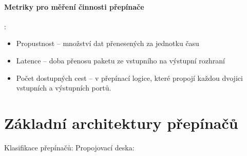 \documentclass[a4paper, 11pt]{report}
\begin{document}
\paragraph{Metriky pro měření činnosti přepínače}:
\begin{itemize}
	\item Propustnost -- množství dat přenesených za jednotku času
	\item Latence -- doba přenosu paketu ze vstupního na výstupní rozhraní
	\item Počet dostupných cest -- v přepínací logice, které propojí každou dvojici vstupních a výstupních portů.
\end{itemize}

\section{Základní architektury přepínačů}
Klasifikace přepínačů: Propojovací deska:
\end{document}
